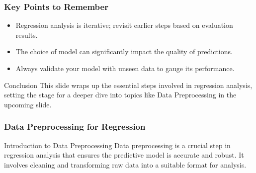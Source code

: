 \documentclass{beamer}
\begin{document}
\begin{frame}[fragile]
    \frametitle{Key Points to Remember}
    \begin{itemize}
        \item Regression analysis is iterative; revisit earlier steps based on evaluation results.
        \item The choice of model can significantly impact the quality of predictions.
        \item Always validate your model with unseen data to gauge its performance.
    \end{itemize}

    \begin{block}{Conclusion}
        This slide wraps up the essential steps involved in regression analysis, setting the stage for a deeper dive into topics like Data Preprocessing in the upcoming slide.
    \end{block}
\end{frame}

\begin{frame}[fragile]
    \frametitle{Data Preprocessing for Regression}
    \begin{block}{Introduction to Data Preprocessing}
        Data preprocessing is a crucial step in regression analysis that ensures the predictive model is accurate and robust. It involves cleaning and transforming raw data into a suitable format for analysis.
    \end{block}
\end{frame}
\end{document}
